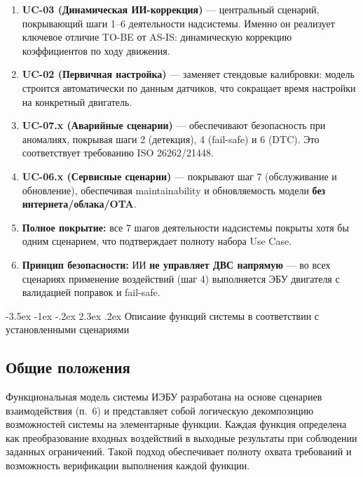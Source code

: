 \documentclass[14pt, a4paper]{extarticle}
\makeatletter
\renewcommand\section{\clearpage\@startsection{section}{1}{1.25cm}%
	{-3.5ex \@plus -1ex \@minus -.2ex}%
	{2.3ex \@plus.2ex}%
	{%
		\bfseries
		\fontsize{16}{1.5}\selectfont
}}
\makeatother
\begin{document}
				\begin{enumerate}
					\item \textbf{UC-03 (Динамическая ИИ-коррекция)} — центральный сценарий, покрывающий шаги 1–6 деятельности надсистемы. Именно он реализует ключевое отличие TO-BE от AS-IS: динамическую коррекцию коэффициентов по ходу движения.
					\item \textbf{UC-02 (Первичная настройка)} — заменяет стендовые калибровки: модель строится автоматически по данным датчиков, что сокращает время настройки на конкретный двигатель.
					\item \textbf{UC-07.x (Аварийные сценарии)} — обеспечивают безопасность при аномалиях, покрывая шаги 2 (детекция), 4 (fail-safe) и 6 (DTC). Это соответствует требованию ISO 26262/21448.
					\item \textbf{UC-06.x (Сервисные сценарии)} — покрывают шаг 7 (обслуживание и обновление), обеспечивая maintainability и обновляемость модели \textbf{без интернета/облака/OTA}.
					\item \textbf{Полное покрытие:} все 7 шагов деятельности надсистемы покрыты хотя бы одним сценарием, что подтверждает полноту набора Use Case.
					\item \textbf{Принцип безопасности:} ИИ \textbf{не управляет ДВС напрямую} — во всех сценариях применение воздействий (шаг 4) выполняется ЭБУ двигателя с валидацией поправок и fail-safe.
				\end{enumerate}
				
				
			\section{Описание функций системы в соответствии с установленными сценариями}
			
				\subsection{Общие положения}
				
					Функциональная модель системы ИЭБУ разработана на основе сценариев взаимодействия (п.~6) и представляет собой логическую декомпозицию возможностей системы на элементарные функции. Каждая функция определена как преобразование входных воздействий в выходные результаты при соблюдении заданных ограничений. Такой подход обеспечивает полноту охвата требований и возможность верификации выполнения каждой функции.
					
\end{document}
